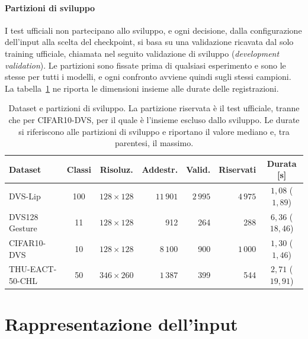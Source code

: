 \paragraph{Partizioni di sviluppo}
\label{subsec:partizioni_sviluppo}

I test ufficiali non partecipano allo sviluppo, e ogni decisione, dalla configurazione dell'input alla scelta del checkpoint, si basa su una validazione ricavata dal solo training ufficiale, chiamata nel seguito validazione di sviluppo (\emph{development validation}). Le partizioni sono fissate prima di qualsiasi esperimento e sono le stesse per tutti i modelli, e ogni confronto avviene quindi sugli stessi campioni. La tabella~\ref{tab:dataset_sintesi} ne riporta le dimensioni insieme alle durate delle registrazioni.

\begin{table}[t]
\centering
\small
\renewcommand{\arraystretch}{1.2}
\caption[Dataset e partizioni di sviluppo]{Dataset e partizioni di sviluppo. La partizione riservata è il test ufficiale, tranne che per CIFAR10-DVS, per il quale è l'insieme escluso dallo sviluppo. Le durate si riferiscono alle partizioni di sviluppo e riportano il valore mediano e, tra parentesi, il massimo.}
\label{tab:dataset_sintesi}
\setlength{\tabcolsep}{4pt}
\begin{tabular}{@{}l c c r r r c@{}}
\hline
\textbf{Dataset} & \textbf{Classi} & \textbf{Risoluz.} & \textbf{Addestr.} & \textbf{Valid.} & \textbf{Riservati} & \textbf{Durata [s]} \\
\hline
DVS-Lip & 100 & $128\times128$ & $11\,901$ & $2\,995$ & $4\,975$ & $1{,}08$ ($1{,}89$) \\
DVS128 Gesture & 11 & $128\times128$ & 912 & 264 & 288 & $6{,}36$ ($18{,}46$) \\
CIFAR10-DVS & 10 & $128\times128$ & $8\,100$ & 900 & $1\,000$ & $1{,}30$ ($1{,}46$) \\
THU-EACT-50-CHL & 50 & $346\times260$ & $1\,387$ & 399 & 544 & $2{,}71$ ($19{,}91$) \\
\hline
\end{tabular}
\end{table}



\section{Rappresentazione dell'input}
\label{sec:input_baseline}


